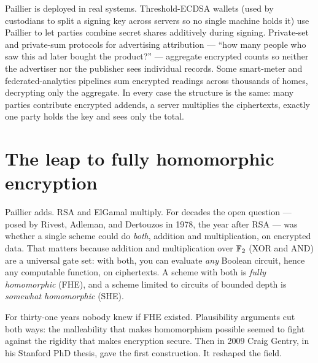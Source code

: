 \begin{applicationbox}
Paillier is deployed in real systems. Threshold-ECDSA wallets (used by custodians to split a signing key across servers so no single machine holds it) use Paillier to let parties combine secret shares additively during signing. Private-set and private-sum protocols for advertising attribution --- ``how many people who saw this ad later bought the product?'' --- aggregate encrypted counts so neither the advertiser nor the publisher sees individual records. Some smart-meter and federated-analytics pipelines sum encrypted readings across thousands of homes, decrypting only the aggregate. In every case the structure is the same: many parties contribute encrypted addends, a server multiplies the ciphertexts, exactly one party holds the key and sees only the total.
\end{applicationbox}

\section{The leap to fully homomorphic encryption}
\label{ch33:fhe-leap}

Paillier adds. RSA and ElGamal multiply. For decades the open question --- posed by Rivest, Adleman, and Dertouzos in 1978, the year after RSA --- was whether a single scheme could do \emph{both}, addition and multiplication, on encrypted data. That matters because addition and multiplication over $\mathbb{F}_2$ (XOR and AND) are a universal gate set: with both, you can evaluate \emph{any} Boolean circuit, hence any computable function, on ciphertexts. A scheme with both is \emph{fully homomorphic} (FHE), and a scheme limited to circuits of bounded depth is \emph{somewhat homomorphic} (SHE).

For thirty-one years nobody knew if FHE existed. Plausibility arguments cut both ways: the malleability that makes homomorphism possible seemed to fight against the rigidity that makes encryption secure. Then in 2009 Craig Gentry, in his Stanford PhD thesis, gave the first construction. It reshaped the field.

